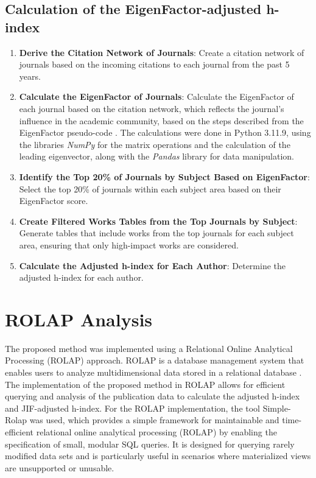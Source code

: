 \subsection{Calculation of the EigenFactor-adjusted h-index}
\begin{enumerate}
      \item \textbf{Derive the Citation Network of Journals}: Create a citation network of journals based on the
            incoming citations to each journal from the past 5 years.
      \item \textbf{Calculate the EigenFactor of Journals}: Calculate the EigenFactor of each journal based on the
            citation network, which reflects the journal's influence in the academic community, based on the steps
            described from the EigenFactor pseudo-code \cite{west2008pseudocode}. The calculations were done  in Python
            3.11.9, using the libraries \emph{NumPy} for the matrix operations and the
            calculation of the leading eigenvector, along with the \emph{Pandas} library
            for data manipulation.
      \item \textbf{Identify the Top 20\% of Journals by Subject Based on EigenFactor}: Select the top 20\% of journals within
            each subject area based on their EigenFactor score\@.

      \item \textbf{Create Filtered Works Tables from the Top Journals by Subject}: Generate tables that include works from
            the top journals for each subject area, ensuring that only high-impact works are considered.


      \item \textbf{Calculate the Adjusted h-index for Each Author}: Determine the adjusted h-index for each author.
\end{enumerate}

\section{ROLAP Analysis}

The proposed method was implemented using a Relational Online Analytical
Processing (ROLAP) approach. ROLAP is a database management system that enables
users to analyze multidimensional data stored in a relational database
\cite{codd1993providing}. The implementation of the proposed method in ROLAP
allows for efficient querying and analysis of the publication data to calculate
the adjusted h-index and JIF-adjusted h-index. For the ROLAP implementation,
the tool Simple-Rolap \cite{simple-rolap} was used, which provides a simple
framework for maintainable and time-efficient relational online analytical
processing (ROLAP) by enabling the specification of small, modular SQL queries.
It is designed for querying rarely modified data sets and is particularly
useful in scenarios where materialized views are unsupported or unusable.

